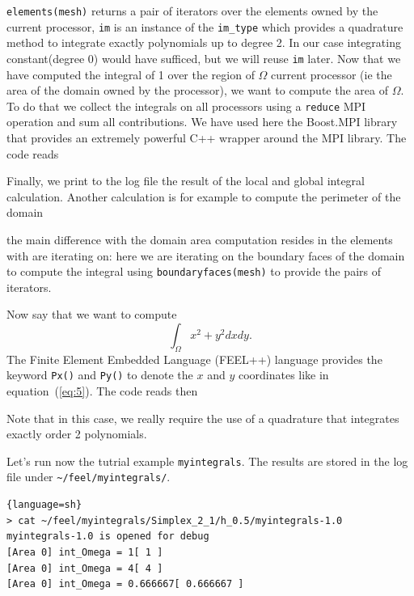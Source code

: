 \documentclass[a4paper]{book}
\newcommand{\cpp}{C{\hspace{-.3em}\vspace{-.2em}\tiny++}\xspace}
\begin{document}
\lstinline!elements(mesh)! returns a pair of iterators over the
elements owned by the current processor, \lstinline!im! is an instance
of the \lstinline!im_type! which provides a quadrature method to
integrate exactly polynomials up to degree 2. In our case integrating
constant(degree 0) would have sufficed, but we will reuse
\lstinline!im! later. Now that we have computed the integral of 1 over
the region of $\Omega$ current processor (ie the area of the domain
owned by the processor), we want to compute the area of $\Omega$. To
do that we collect the integrals on all processors using a
\lstinline!reduce! MPI operation and sum all contributions. We have
used here the Boost.MPI library that provides an extremely powerful
\cpp wrapper around the MPI library. The code reads



\noindent
Finally, we print to the log file the result of the local and global
integral calculation. Another calculation is for example to compute
the perimeter of the domain



\noindent
the main difference with the domain area computation resides in the
elements with are iterating on: here we are iterating on the boundary
faces of the domain to compute the integral using
\lstinline!boundaryfaces(mesh)! to provide the pairs of iterators.


Now say that we want to compute
\begin{equation}
  \label{eq:5}
  \int_\Omega x^2 + y^2 dx dy.
\end{equation}
The Finite Element Embedded Language (FEEL++) language provides the
keyword \lstinline!Px()! and \lstinline!Py()! to denote the $x$ and
$y$ coordinates like in equation~(\ref{eq:5}).  The code reads then




Note that in this case, we really require the use of a quadrature that
integrates exactly order 2 polynomials.

Let's run now the tutrial example \lstinline!myintegrals!. The results are stored
in the log file under \lstinline!~/feel/myintegrals/!.

\begin{lstlisting}{language=sh}
> cat ~/feel/myintegrals/Simplex_2_1/h_0.5/myintegrals-1.0
myintegrals-1.0 is opened for debug
[Area 0] int_Omega = 1[ 1 ]
[Area 0] int_Omega = 4[ 4 ]
[Area 0] int_Omega = 0.666667[ 0.666667 ]
\end{lstlisting}
\end{document}
